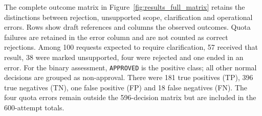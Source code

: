 The complete outcome matrix in Figure~\ref{fig:results_full_matrix} retains
the distinctions between rejection, unsupported scope, clarification and
operational errors. Rows show draft references and columns the observed outcomes. Quota failures
are retained in the error column and are not counted as correct rejections. Among 100 requests expected to require clarification,
57 received that result, 38 were marked unsupported, four were rejected
and one ended in an error. For the binary assessment, \texttt{APPROVED} is the positive class; all other normal decisions are grouped as non-approval. There were
181 true positives (TP), 396 true negatives (TN), one false positive (FP)
and 18 false negatives (FN). The four quota errors remain outside the
596-decision matrix but are included in the 600-attempt totals.


\begin{figure}[H]
\centering
{}
\end{figure}
